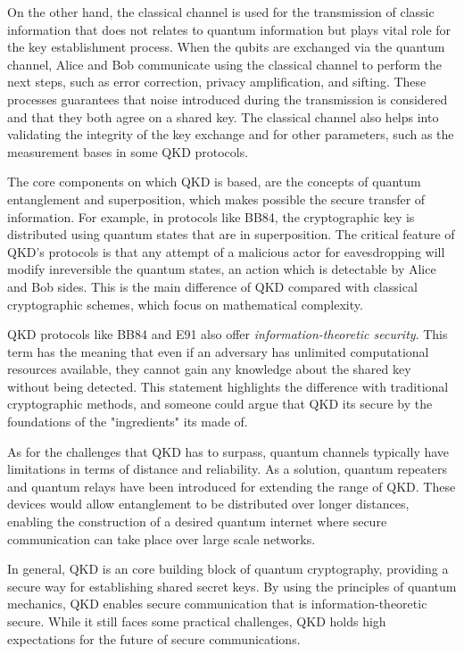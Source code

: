 		On the other hand, the classical channel is used for the transmission of classic information 
		that does not relates to quantum information but plays vital role for the key establishment process.
		When the qubits are exchanged via the quantum channel, Alice and Bob communicate using the classical channel
		to perform the next steps, such as error correction, privacy amplification, and sifting. 
		These processes guarantees that noise introduced during the transmission is considered 
		and that they both agree on a shared key.
		The classical channel also helps into validating the integrity of the key exchange
		and for other parameters, such as the measurement bases in some QKD protocols.

		The core components on which QKD is based, are the concepts of quantum entanglement and superposition,
		which makes possible the secure transfer of information. 
		For example, in protocols like BB84, the cryptographic key is distributed using quantum states
		that are in superposition. The critical feature of QKD's protocols is that any attempt of a malicious actor for
		eavesdropping will modify inreversible the quantum states, an action which is detectable by Alice and Bob sides.
		This is the main difference of QKD compared with classical cryptographic schemes, which focus on mathematical complexity. 

		QKD protocols like BB84 and E91 also offer \textit{information-theoretic security}. This term has the meaning that even 
		if an adversary has unlimited computational resources available, they cannot gain any knowledge about the 
		shared key without being detected. This statement highlights the difference with traditional cryptographic methods, and 
		someone could argue that QKD its secure by the foundations of the "ingredients" its made of.

		As for the challenges that QKD has to surpass, quantum channels typically have limitations in terms of distance and reliability.
		As a solution, quantum repeaters and quantum relays have been introduced for extending the range of QKD. 
		These devices would allow entanglement to be distributed over longer distances, 
		enabling the construction of a desired quantum internet where secure communication can take place over large scale networks.

		In general, QKD is an core building block of quantum cryptography,
		providing a secure way for establishing shared secret keys. 
		By using the principles of quantum mechanics, QKD enables secure communication that is 
		information-theoretic secure. While it still faces some practical challenges, QKD holds high expectations for the 
		future of secure communications.

